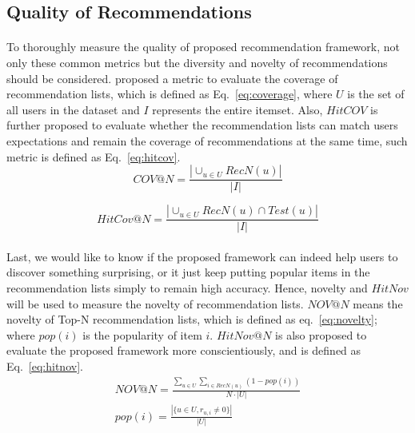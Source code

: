 \documentclass[a4paper,12pt]{report}
\begin{document}
\subsection{Quality of Recommendations}
\paragraph{}
To thoroughly measure the quality of proposed recommendation framework, not only these common metrics but the diversity and novelty of recommendations should be considered. \cite{KaminskasCoverage, 8826263} proposed a metric to evaluate the coverage of recommendation lists, which is defined as Eq.~\eqref{eq:coverage}, where $U$ is the set of all users in the dataset and $I$ represents the entire itemset. Also, $HitCOV$ is further proposed to evaluate whether the recommendation lists can match users expectations and remain the coverage of recommendations at the same time, such metric is defined as Eq.~\eqref{eq:hitcov}.
\begin{equation}
    COV@N = \frac{|\cup_{u\in U}RecN(u)|}{|I|} 
    \label{eq:coverage}
\end{equation}

\begin{equation}
    HitCov@N = \frac{|\cup_{u\in U} RecN(u)\cap Test(u)|}{|I|}
    \label{eq:hitcov}
\end{equation}

\paragraph{}
Last, we would like to know if the proposed framework can indeed help users to discover something surprising, or it just keep putting popular items in the recommendation lists simply to remain high accuracy. Hence, novelty and $HitNov$ will be used to measure the novelty of recommendation lists. $NOV@N$ means the novelty of Top-N recommendation lists, which is defined as eq.~\eqref{eq:novelty}; where $pop(i)$ is the popularity of item $i$. $HitNov@N$ is also proposed to 
evaluate the proposed framework more conscientiously, and is defined as Eq.~\eqref{eq:hitnov}.
\begin{equation}
    \begin{aligned}
        NOV@N = \frac{\sum_{u\in U}\sum_{i\in RecN(u)}(1-pop(i))}{N\cdot |U|} \\
        pop(i) = \frac{|\{u\in U, r_{u,i}\neq 0\}|}{|U|}
    \end{aligned}
    \label{eq:novelty}
\end{equation}
\end{document}
